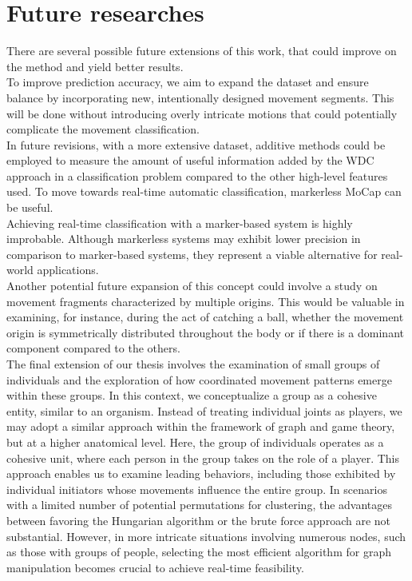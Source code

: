 \clearpage


\section{Future researches}
\label{sec:future_researches}
There are several possible future extensions of this work, that could improve on the method and yield better results. \\

To improve prediction accuracy, we aim to expand the dataset and ensure balance by incorporating new, intentionally designed movement segments.
This will be done without introducing overly intricate motions that could potentially complicate the movement classification.\\

In future revisions, with a more extensive dataset, additive methods could be employed to measure the amount of useful information added by the WDC approach in a classification problem compared to the other high-level features used.
To move towards real-time automatic classification, markerless MoCap can be useful.\\

Achieving real-time classification with a marker-based system is highly improbable.
Although markerless systems may exhibit lower precision in comparison to marker-based systems, 
they represent a viable alternative for real-world applications.\\

Another potential future expansion of this concept could involve a study on movement fragments characterized by multiple origins.
This would be valuable in examining, for instance, during the act of catching a ball, whether the movement origin is symmetrically distributed throughout the body or if there is a dominant component compared to the others.\\

The final extension of our thesis involves the examination of small groups of individuals and the exploration of how coordinated movement patterns emerge within these groups.
In this context, we conceptualize a group as a cohesive entity, similar to an organism.
Instead of treating individual joints as players, we may adopt a similar approach within the framework of graph and game theory, but at a higher anatomical level.
Here, the group of individuals operates as a cohesive unit, where each person in the group takes on the role of a player. 
This approach enables us to examine leading behaviors, including those exhibited by individual initiators whose movements influence the entire group.
In scenarios with a limited number of potential permutations for clustering, the advantages between favoring the Hungarian algorithm or the brute force approach are not substantial. 
However, in more intricate situations involving numerous nodes, such as those with groups of people, selecting the most efficient algorithm for graph manipulation becomes crucial to achieve real-time feasibility.
